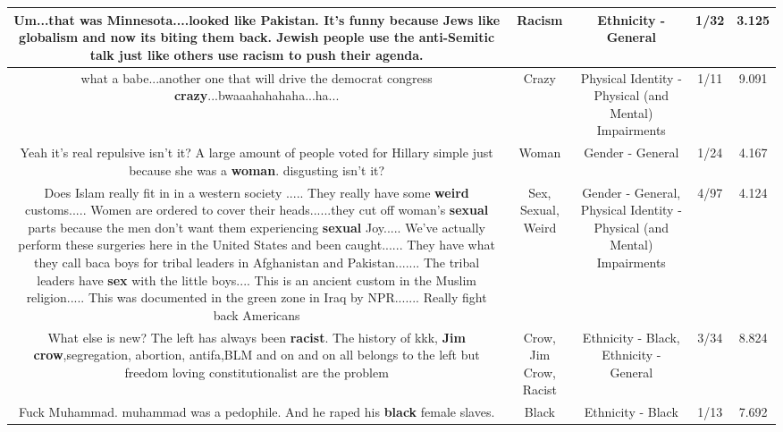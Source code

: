 \documentclass[11pt]{article}
\newlength\mylength
\begin{document}
\begin{center}
\begin{longtable}{|C{.65\mylength}|C{.30\mylength}|C{.12\mylength}|C{.12\mylength}|C{.12\mylength}|}
  \small Um...that was Minnesota....looked like Pakistan. It's funny because Jews like globalism and now its biting them back. Jewish people use the anti-Semitic talk just like others use \textbf{racism} to push their agenda.\normalsize   & Racism & Ethnicity - General & 1/32 & 3.125 \\  \hline
  \small what a babe...another one that will drive the democrat congress \textbf{crazy}...bwaaahahahaha...ha...\normalsize   & Crazy & Physical Identity - Physical (and Mental) Impairments & 1/11 & 9.091 \\  \hline
  \small Yeah it's real repulsive isn't it?   A large amount of people voted for Hillary simple just because she was a \textbf{woman}. disgusting isn't it?\normalsize   & Woman & Gender - General & 1/24 & 4.167 \\  \hline
  \small Does Islam really fit in in a western society ..... They really have some \textbf{weird} customs..... Women are ordered to cover their heads......they cut off woman's \textbf{sexual} parts because the men don't want them experiencing \textbf{sexual} Joy..... We've actually perform these surgeries here in the United States and been caught...... They have what they call baca boys for tribal leaders in Afghanistan and Pakistan....... The tribal leaders have \textbf{sex} with the little boys.... This is an ancient custom in the Muslim religion..... This was documented in the green zone in Iraq by NPR....... Really fight back Americans\normalsize   & Sex, Sexual, Weird & Gender - General, Physical Identity - Physical (and Mental) Impairments & 4/97 & 4.124 \\  \hline
  \small What else is new? The left has always been \textbf{racist}. The history of kkk, \textbf{Jim c\textbf{row}},segregation, abortion, antifa,BLM and on and on all belongs to the left but freedom loving constitutionalist are the problem\normalsize   & Crow, Jim Crow, Racist & Ethnicity - Black, Ethnicity - General & 3/34 & 8.824 \\  \hline
  \small Fuck Muhammad. muhammad was a pedophile. And he raped his \textbf{black} female slaves.\normalsize   & Black & Ethnicity - Black & 1/13 & 7.692 \\  \hline

\end{longtable}
\end{center}
\end{document}
